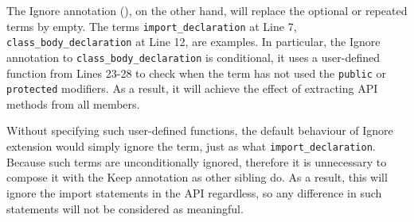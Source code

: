 \documentclass[10pt, conference, compsocconf]{IEEEtran}
\begin{document}
The Ignore annotation (), on the other hand, will replace the optional or repeated terms by empty. The terms {\tt import\_declaration} at Line 7, {\tt class\_body\_declaration} at Line 12, are examples. In particular, the Ignore annotation to {\tt class\_body\_declaration} is conditional, it uses a user-defined function from Lines 23-28 to check when the term has not used the {\tt public} or {\tt protected} modifiers. As a result, it will achieve the effect of extracting API methods from all members. 

Without specifying such user-defined functions, the default behaviour of Ignore extension would simply ignore the term, just as what {\tt import\_declaration}. Because such terms are unconditionally ignored, therefore it is unnecessary to compose it with the Keep annotation as other sibling do. As a result, this will ignore the import statements in the API regardless, so any difference in such statements will not be considered as meaningful.
\end{document}
